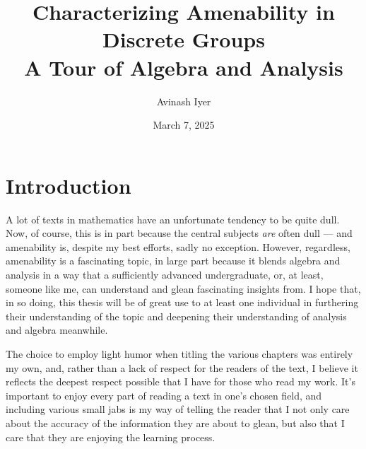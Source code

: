 \documentclass[10pt]{package2}
\title{Characterizing Amenability in Discrete Groups\\{\large A Tour of Algebra and Analysis}}
\author{Avinash Iyer}
\date{March 7, 2025}
\begin{document}
\maketitle
\RaggedRight
\tableofcontents
\chapter{Introduction}
A lot of texts in mathematics have an unfortunate tendency to be quite dull. Now, of course, this is in part because the central subjects \textit{are} often dull --- and amenability is, despite my best efforts, sadly no exception. However, regardless, amenability is a fascinating topic, in large part because it blends algebra and analysis in a way that a sufficiently advanced undergraduate, or, at least, someone like me, can understand and glean fascinating insights from. I hope that, in so doing, this thesis will be of great use to at least one individual in furthering their understanding of the topic and deepening their understanding of analysis and algebra meanwhile.\newline

The choice to employ light humor when titling the various chapters was entirely my own, and, rather than a lack of respect for the readers of the text, I believe it reflects the deepest respect possible that I have for those who read my work. It's important to enjoy every part of reading a text in one's chosen field, and including various small jabs is my way of telling the reader that I not only care about the accuracy of the information they are about to glean, but also that I care that they are enjoying the learning process.\newline
\end{document}
